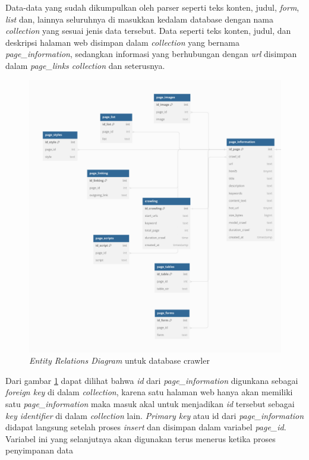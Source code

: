 Data-data yang sudah dikumpulkan oleh parser seperti teks konten, judul, \emph{form}, \emph{list} dan, lainnya seluruhnya di masukkan kedalam database dengan nama \emph{collection} yang sesuai jenis data tersebut. Data seperti teks konten, judul, dan deskripsi halaman web disimpan dalam \emph{collection} yang bernama \emph{page\_information}, sedangkan informasi yang berhubungan dengan \emph{url} disimpan dalam \emph{page\_links collection} dan seterusnya.

\begin{figure}[H]
  \centering
  \includegraphics[keepaspectratio, width=14.5cm]{gambar/crawler-erd.png}
  \caption{\emph{Entity Relations Diagram} untuk database crawler}
  \label{gambar:erd-crawler}
\end{figure}

Dari gambar \ref{gambar:erd-crawler} dapat dilihat bahwa \emph{id} dari \emph{page\_information} digunkana sebagai \emph{foreign key} di dalam \emph{collection}, karena satu halaman web hanya akan memiliki satu \emph{page\_information} maka masuk akal untuk menjadikan \emph{id} tersebut sebagai \emph{key identifier} di dalam \emph{collection} lain. \emph{Primary key} atau id dari \emph{page\_information} didapat langsung setelah proses \emph{insert} dan disimpan dalam variabel \emph{page\_id}. Variabel ini yang selanjutnya akan digunakan terus menerus ketika proses penyimpanan data

